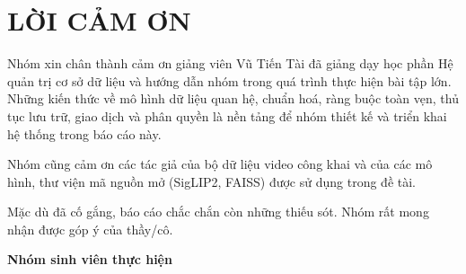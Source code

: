 \chapter*{LỜI CẢM ƠN}

Nhóm xin chân thành cảm ơn giảng viên Vũ Tiến Tài đã giảng dạy học phần Hệ
quản trị cơ sở dữ liệu và hướng dẫn nhóm trong quá trình thực hiện bài tập lớn. Những kiến
thức về mô hình dữ liệu quan hệ, chuẩn hoá, ràng buộc toàn vẹn, thủ tục lưu trữ, giao dịch và
phân quyền là nền tảng để nhóm thiết kế và triển khai hệ thống trong báo cáo này.

Nhóm cũng cảm ơn các tác giả của bộ dữ liệu video công khai và của các mô hình, thư viện mã
nguồn mở (SigLIP2, FAISS) được sử dụng trong đề tài.

Mặc dù đã cố gắng, báo cáo chắc chắn còn những thiếu sót. Nhóm rất mong nhận được góp ý
của thầy/cô.

\begin{flushright}
\textbf{Nhóm sinh viên thực hiện}
\end{flushright}
\clearpage
